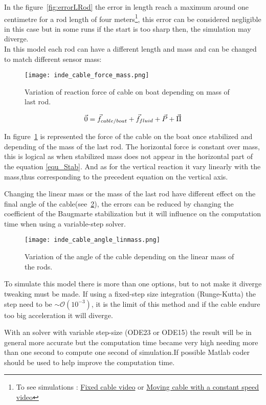 In the figure~\ref{fig:errorLRod} the error in length reach a maximum around one centimetre for a rod length of four meters\footnote{To see simulations : \href{https://www.youtube.com/watch?v=T7DRGq3E5x8}{Fixed cable video} or \href{https://www.youtube.com/watch?v=V4X0PsgsXZY to see simulations}{Moving cable with a constant speed video}}, this error can be considered negligible in this case but in some runs if the start is too sharp then, the simulation may diverge.\\

In this model each rod can have a different length and mass and can be changed to match different sensor mass:

\begin{figure}[H]
\centering
    \texttt{[image: inde\_cable\_force\_mass.png]}
    \caption{Variation of reaction force of cable on boat depending on mass of last rod.}
    \label{fig:massForce}
\end{figure}

\begin{equation}
 \vec{0} = \vec{f}_{cable/boat}+\vec{f}_{fluid}+\vec{P}+\vec{\Pi}\\
 \label{equ_Stab}
\end{equation}


In figure~\ref{fig:massForce} is represented the force of the cable on the boat once stabilized and depending of the mass of the last rod. The horizontal force is constant over mass, this is logical as when stabilized mass does not appear in the horizontal part of the equation \eqref{equ_Stab}. And as for the vertical reaction it vary linearly with the mass,thus corresponding to the precedent equation on the vertical axis.

Changing the linear mass or the mass of the last rod have different effect on the final angle of the cable(see~\ref{fig:linmassAngle}), the errors can be reduced by changing the coefficient of the Baugmarte stabilization but it will influence on the computation time when using a variable-step solver.

\begin{figure}[H]
\centering
    \texttt{[image: inde\_cable\_angle\_linmass.png]}
    \caption{Variation of the angle of the cable depending on the linear mass of the rods.}
    \label{fig:linmassAngle}
\end{figure}

To simulate this model there is more than one options, but to not make it diverge tweaking must be made.
If using a fixed-step size integration (Runge-Kutta) the step need to be $\sim\mathcal{O}(10^{-3})$, it is the limit of this method and if the cable endure too big acceleration it will diverge.

With an solver with variable step-size (ODE23 or ODE15) the result will be in general more accurate but the computation time became very high needing more than one second to compute one second of simulation.If possible Matlab coder should be used to help improve the computation time.
